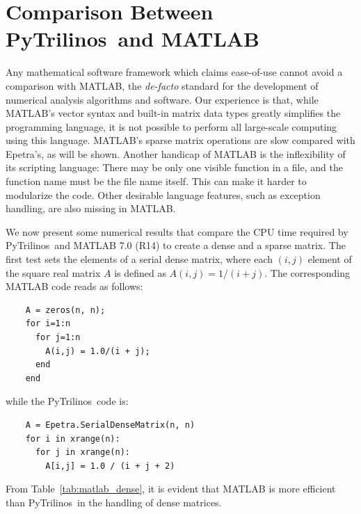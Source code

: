\documentclass[acmtocl]{acmtrans2m}
\newcommand{\PyTrilinos}{{PyTrilinos}}
\begin{document}
\section{Comparison Between \PyTrilinos\ and MATLAB}
\label{sec:comparison_matlab}

Any mathematical software framework which claims ease-of-use cannot
avoid a comparison with MATLAB, the {\sl de-facto} standard for the
development of numerical analysis algorithms and software.  Our
experience is that, while MATLAB's vector syntax and built-in matrix
data types greatly simplifies the programming language, it is not
possible to perform all large-scale computing using this language.
MATLAB's sparse matrix operations are slow compared with Epetra's,
as will be shown.  Another handicap of MATLAB is the inflexibility
of its scripting language: There may be only one visible function in
a file, and the function name must be the file name itself.  This
can make it harder to modularize the code.  Other desirable language
features, such as exception handling, are also missing in MATLAB.

We now present some numerical results that compare the CPU time
required by \PyTrilinos\ and MATLAB 7.0 (R14) to create a dense and a
sparse matrix.  The first test sets the elements of a serial dense
matrix, where each $(i,j)$ element of the square real matrix $A$ is
defined as $A(i,j) = 1/(i + j)$.  The corresponding MATLAB code reads
as follows:
\begin{verbatim}
    A = zeros(n, n);
    for i=1:n
      for j=1:n
        A(i,j) = 1.0/(i + j);
      end
    end
\end{verbatim}
while the \PyTrilinos\ code is:
\begin{verbatim}
    A = Epetra.SerialDenseMatrix(n, n)
    for i in xrange(n):
      for j in xrange(n):
        A[i,j] = 1.0 / (i + j + 2)
\end{verbatim}
From Table~\ref{tab:matlab_dense}, it is evident that MATLAB is more
efficient than \PyTrilinos\ in the handling of dense matrices.
\end{document}
